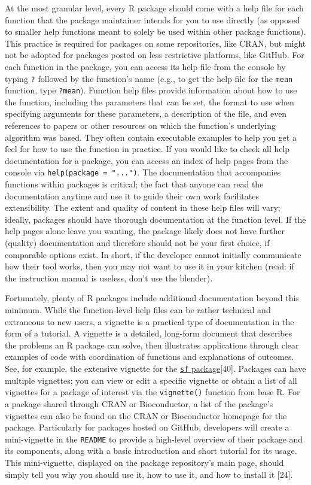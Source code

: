 \documentclass[10pt,letterpaper]{article}
\begin{document}
At the most granular level, every R package should come with a help file
for each function that the package maintainer intends for you to use
directly (as opposed to smaller help functions meant to solely be used
within other package functions). This practice is required for packages
on some repositories, like CRAN, but might not be adopted for packages
posted on less restrictive platforms, like GitHub. For each function in
the package, you can access its help file from the console by typing
\texttt{?} followed by the function's name (e.g., to get the help file
for the \texttt{mean} function, type \texttt{?mean}). Function help
files provide information about how to use the function, including the
parameters that can be set, the format to use when specifying arguments
for these parameters, a description of the file, and even references to
papers or other resources on which the function's underlying algorithm
was based. They often contain executable examples to help you get a feel
for how to use the function in practice. If you would like to check all
help documentation for a package, you can access an index of help pages
from the console via \texttt{help(package\ =\ "...")}. The documentation
that accompanies functions within packages is critical; the fact that
anyone can read the documentation anytime and use it to guide their own
work facilitates extensibility. The extent and quality of content in
these help files will vary; ideally, packages should have thorough
documentation at the function level. If the help pages alone leave you
wanting, the package likely does not have further (quality)
documentation and therefore should not be your first choice, if
comparable options exist. In short, if the developer cannot initially
communicate how their tool works, then you may not want to use it in
your kitchen (read: if the instruction manual is useless, don't use the
blender).

Fortunately, plenty of R packages include additional documentation
beyond this minimum. While the function-level help files can be rather
technical and extraneous to new users, a vignette is a practical type of
documentation in the form of a tutorial. A vignette is a detailed,
long-form document that describes the problems an R package can solve,
then illustrates applications through clear examples of code with
coordination of functions and explanations of outcomes. See, for
example, the extensive vignette for the
\href{https://cran.r-project.org/web/packages/sf/vignettes/sf1.html}{\texttt{sf}
package}{[}40{]}. Packages can have multiple vignettes; you can view or
edit a specific vignette or obtain a list of all vignettes for a package
of interest via the \texttt{vignette()} function from base R. For a
package shared through CRAN or Bioconductor, a list of the package's
vignettes can also be found on the CRAN or Bioconductor homepage for the
package. Particularly for packages hosted on GitHub, developers will
create a mini-vignette in the \texttt{README} to provide a high-level
overview of their package and its components, along with a basic
introduction and short tutorial for its usage. This mini-vignette,
displayed on the package repository's main page, should simply tell you
why you should use it, how to use it, and how to install it {[}24{]}.
\end{document}
